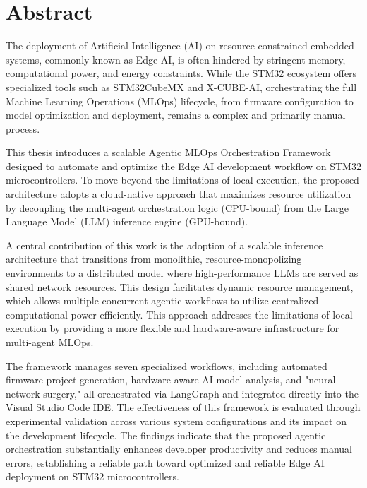 \section{Abstract}
The deployment of Artificial Intelligence (AI) on resource-constrained embedded systems, commonly known as Edge AI, is often hindered by stringent memory, computational power, and energy constraints. While the STM32 ecosystem offers specialized tools such as STM32CubeMX and X-CUBE-AI, orchestrating the full Machine Learning Operations (MLOps) lifecycle, from firmware configuration to model optimization and deployment, remains a complex and primarily manual process.

This thesis introduces a scalable Agentic MLOps Orchestration Framework designed to automate and optimize the Edge AI development workflow on STM32 microcontrollers. To move beyond the limitations of local execution, the proposed architecture adopts a cloud-native approach that maximizes resource utilization by decoupling the multi-agent orchestration logic (CPU-bound) from the Large Language Model (LLM) inference engine (GPU-bound).

A central contribution of this work is the adoption of a scalable inference architecture that transitions from monolithic, resource-monopolizing environments to a distributed model where high-performance LLMs are served as shared network resources. This design facilitates dynamic resource management, which allows multiple concurrent agentic workflows to utilize centralized computational power efficiently. This approach addresses the limitations of local execution by providing a more flexible and hardware-aware infrastructure for multi-agent MLOps.

The framework manages seven specialized workflows, including automated firmware project generation, hardware-aware AI model analysis, and "neural network surgery," all orchestrated via LangGraph and integrated directly into the Visual Studio Code IDE. The effectiveness of this framework is evaluated through experimental validation across various system configurations and its impact on the development lifecycle. The findings indicate that the proposed agentic orchestration substantially enhances developer productivity and reduces manual errors, establishing a reliable path toward optimized and reliable Edge AI deployment on STM32 microcontrollers.
